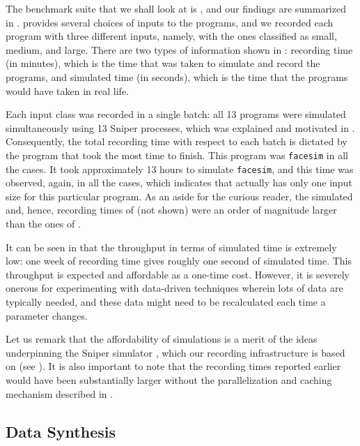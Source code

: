 The benchmark suite that we shall look at is , and our findings are
summarized in .  provides several choices of inputs
to the programs, and we recorded each program with three different inputs,
namely, with the ones classified as small, medium, and large. There are two
types of information shown in : recording time (in minutes),
which is the time that was taken to simulate and record the programs, and
simulated time (in seconds), which is the time that the programs would have
taken in real life.

Each input class was recorded in a single batch: all 13 programs were simulated
simultaneously using 13 Sniper processes, which was explained and motivated in
. Consequently, the total recording time with respect to each
batch is dictated by the program that took the most time to finish. This program
was \texttt{facesim} in all the cases. It took approximately 13 hours to
simulate \texttt{facesim}, and this time was observed, again, in all the cases,
which indicates that  actually has only one input size for this
particular program. As an aside for the curious reader, the simulated and,
hence, recording times of  (not shown) were an order of
magnitude larger than the ones of .

It can be seen in  that the throughput in terms of simulated
time is extremely low: one week of recording time gives roughly one second of
simulated time. This throughput is expected and affordable as a one-time cost.
However, it is severely onerous for experimenting with data-driven techniques
wherein lots of data are typically needed, and these data might need to be
recalculated each time a parameter changes.

Let us remark that the affordability of simulations is a merit of the ideas
underpinning the Sniper simulator \cite{carlson2011}, which our recording
infrastructure is based on (see ). It is also important to note
that the recording times reported earlier would have been substantially larger
without the parallelization and caching mechanism described in .

\subsection{Data Synthesis}
